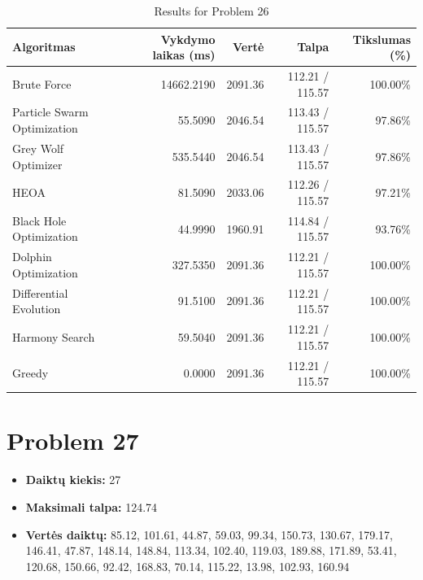 \documentclass[a4paper,11pt]{article}
\begin{document}
\begin{table}[h!]
\centering
\begin{tabular}{lrrrr}
\toprule
\textbf{Algoritmas} & \textbf{Vykdymo laikas (ms)} & \textbf{Vertė} & \textbf{Talpa} & \textbf{Tikslumas (\%)} \\
\midrule
Brute Force & 14662.2190 & 2091.36 & 112.21 / 115.57 & 100.00\% \\
Particle Swarm Optimization & 55.5090 & 2046.54 & 113.43 / 115.57 & 97.86\% \\
Grey Wolf Optimizer & 535.5440 & 2046.54 & 113.43 / 115.57 & 97.86\% \\
HEOA & 81.5090 & 2033.06 & 112.26 / 115.57 & 97.21\% \\
Black Hole Optimization & 44.9990 & 1960.91 & 114.84 / 115.57 & 93.76\% \\
Dolphin Optimization & 327.5350 & 2091.36 & 112.21 / 115.57 & 100.00\% \\
Differential Evolution & 91.5100 & 2091.36 & 112.21 / 115.57 & 100.00\% \\
Harmony Search & 59.5040 & 2091.36 & 112.21 / 115.57 & 100.00\% \\
Greedy & 0.0000 & 2091.36 & 112.21 / 115.57 & 100.00\% \\
\bottomrule
\end{tabular}
\caption{Results for Problem 26}
\end{table}
\clearpage

\section*{Problem 27}
\begin{itemize}
    \item \textbf{Daiktų kiekis:} 27
    \item \textbf{Maksimali talpa:} 124.74
    \item \textbf{Vertės daiktų:} 85.12, 101.61, 44.87, 59.03, 99.34, 150.73, 130.67, 179.17, 146.41, 47.87, 148.14, 148.84, 113.34, 102.40, 119.03, 189.88, 171.89, 53.41, 120.68, 150.66, 92.42, 168.83, 70.14, 115.22, 13.98, 102.93, 160.94
\end{itemize}
\end{document}
